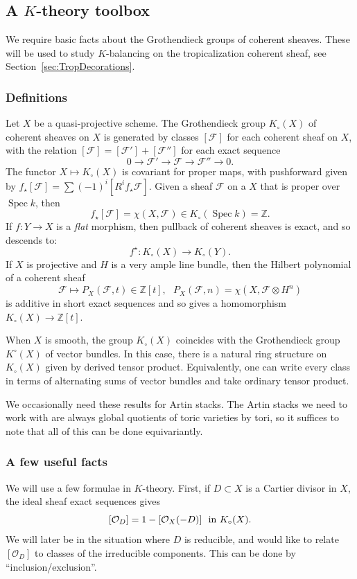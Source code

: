 \documentclass[11pt]{amsart}
\theoremstyle{definition}
\theoremstyle{definition}
\newcommand{\Spec}{\operatorname{Spec}}
\begin{document}
\subsection{A $K$-theory toolbox}\label{sec: toolbox} We require basic facts about the Grothendieck groups of coherent sheaves. These will be used to study $K$-balancing on the tropicalization coherent sheaf, see Section~\ref{sec:TropDecorations}. 

\subsubsection{Definitions} Let $X$ be a quasi-projective scheme. The Grothendieck group $K_\circ(X)$ of coherent sheaves on $X$ is generated by classes $[\mathcal F]$ for each coherent sheaf on $X$, with the relation $[\mathcal F] = [\mathcal F']+[\mathcal F'']$ for each exact sequence
\[
0\to \mathcal F'\to\mathcal F\to\mathcal F''\to 0.
\]
The functor $X\mapsto K_\circ(X)$ is covariant for proper maps, with pushforward given by $f_\star[\mathcal F] = \sum (-1)^i [R^if_\star\mathcal F]$. Given a sheaf $\mathcal F$ on a $X$ that is proper over $\Spec k$, then
\[
f_\star[\mathcal F] = \chi(X,\mathcal F)\in K_\circ(\Spec k) = \mathbb Z.
\]
If $f\colon Y\to X$ is a {\it flat} morphism, then pullback of coherent sheaves is exact, and so descends to:
\[
f^\star\colon K_\circ(X)\to K_\circ(Y). 
\]
If $X$ is projective and $H$ is a very ample line bundle, then the Hilbert polynomial of a coherent sheaf
\[
\mathcal F\mapsto P_X(\mathcal F,t)\in \mathbb Z[t], \ \ \ P_X(\mathcal F,n) = \chi(X,\mathcal F\otimes H^n)
\]
is additive in short exact sequences and so gives a homomorphism $K_\circ(X)\to \mathbb Z[t]$. 

When $X$ is smooth, the group $K_\circ(X)$ coincides with the Grothendieck group $K^\circ(X)$ of vector bundles. In this case, there is a natural ring structure on $K_\circ(X)$ given by derived tensor product. Equivalently, one can write every class in terms of alternating sums of vector bundles and take ordinary tensor product. 

We occasionally need these results for Artin stacks. The Artin stacks we need to work with are always global quotients of toric varieties by tori, so it suffices to note that all of this can be done equivariantly. 

\subsubsection{A few useful facts}\label{sec: basic-formulae} We will use a few formulae in $K$-theory. First, if $D\subset X$ is a Cartier divisor in $X$, the ideal sheaf exact sequences gives
\[
[\mathcal O_D] = 1-[\mathcal O_X(-D)] \ \textnormal{ in } K_\circ(X).
\]
We will later be in the situation where $D$ is reducible, and would like to relate $[\mathcal O_D]$ to classes of the irreducible components. This can be done by ``inclusion/exclusion''. 
\end{document}
